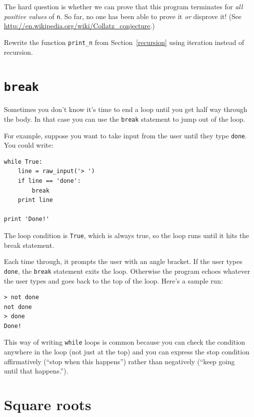 \documentclass[10pt]{book}
\begin{document}
\begin{CJK}{UTF8}{gbsn}
The hard question is whether we can prove that this program terminates
for {\em all positive values} of {\tt n}.  So far, no one has
been able to prove it {\em or} disprove it!  (See
  \url{http://en.wikipedia.org/wiki/Collatz_conjecture}.)

\begin{exercise}

Rewrite the function \verb"print_n" from
Section~\ref{recursion} using iteration instead of recursion.

\end{exercise}


\section{{\tt break}}

Sometimes you don't know it's time to end a loop until you get half
way through the body.  In that case you can use the {\tt break}
statement to jump out of the loop.

For example, suppose you want to take input from the user until they
type {\tt done}.  You could write:

\begin{verbatim}
while True:
    line = raw_input('> ')
    if line == 'done':
        break
    print line

print 'Done!'
\end{verbatim}
%
The loop condition is {\tt True}, which is always true, so the
loop runs until it hits the break statement.

Each time through, it prompts the user with an angle bracket.
If the user types {\tt done}, the {\tt break} statement exits
the loop.  Otherwise the program echoes whatever the user types
and goes back to the top of the loop.  Here's a sample run:

\begin{verbatim}
> not done
not done
> done
Done!
\end{verbatim}
%
This way of writing {\tt while} loops is common because you
can check the condition anywhere in the loop (not just at the
top) and you can express the stop condition affirmatively
(``stop when this happens'') rather than negatively (``keep going
until that happens.'').


\section{Square roots}
\label{squareroot}


\end{CJK}
\end{document}
